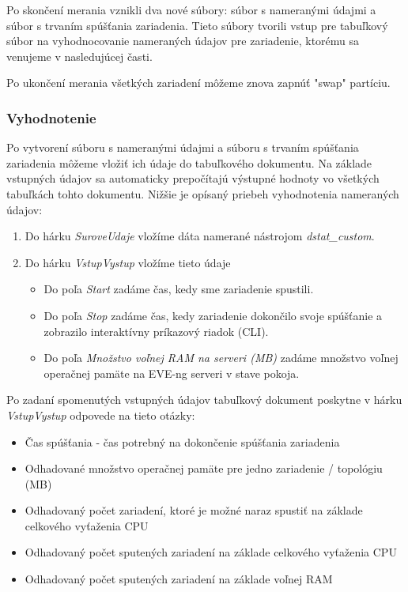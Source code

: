 Po skončení merania vznikli dva nové súbory: súbor s nameranými údajmi a súbor s trvaním spúšťania zariadenia. Tieto súbory tvorili vstup pre tabuľkový súbor na vyhodnocovanie nameraných údajov pre zariadenie, ktorému sa venujeme v nasledujúcej časti.

Po ukončení merania všetkých zariadení môžeme znova zapnúť "swap" partíciu.




\subsubsection{Vyhodnotenie}
\label{chap:testovanie_zariadeni_benchmark_vyhodnotenie}

Po vytvorení súboru s nameranými údajmi a súboru s trvaním spúšťania zariadenia môžeme vložiť ich údaje do tabuľkového dokumentu. Na základe vstupných údajov sa automaticky prepočítajú výstupné hodnoty vo všetkých tabuľkách tohto dokumentu. Nižšie je opísaný priebeh vyhodnotenia nameraných údajov:

\begin{enumerate}[noitemsep]
    \item Do hárku \emph{SuroveUdaje} vložíme dáta namerané nástrojom \emph{dstat\_custom}.
    \item Do hárku \emph{VstupVystup} vložíme tieto údaje
    \begin{itemize}[noitemsep]
        \item Do poľa \emph{Start} zadáme čas, kedy sme zariadenie spustili.
        \item Do poľa \emph{Stop} zadáme čas, kedy zariadenie dokončilo svoje spúšťanie a zobrazilo interaktívny príkazový riadok (CLI).
        \item Do poľa \emph{Množstvo voľnej RAM na serveri (MB)} zadáme množstvo voľnej operačnej pamäte na EVE-ng serveri v stave pokoja.
    \end{itemize}
\end{enumerate}

Po zadaní spomenutých vstupných údajov tabuľkový dokument poskytne v hárku \emph{VstupVystup} odpovede na tieto otázky:

\begin{itemize}[noitemsep]
    \item Čas spúšťania - čas potrebný na dokončenie spúšťania zariadenia
    \item Odhadované množstvo operačnej pamäte pre jedno zariadenie / topológiu (MB)
    \item Odhadovaný počet zariadení, ktoré je možné naraz spustiť na základe celkového vyťaženia CPU
    \item Odhadovaný počet sputených zariadení na základe celkového vyťaženia CPU
    \item Odhadovaný počet sputených zariadení na základe voľnej RAM
\end{itemize}

